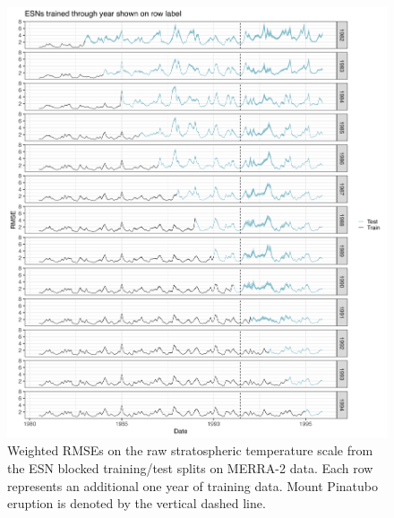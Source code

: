 \documentclass[AMS,STIX2COL]{WileyNJD-v2}
\begin{document}
\begin{figure}[h]
    \centering
    \includegraphics[width=\textwidth]{figures/merra2_rmse.png}
    \caption{Weighted RMSEs on the raw stratospheric temperature scale from the ESN blocked training/test splits on MERRA-2 data. Each row represents an additional one year of training data. Mount Pinatubo eruption is denoted by the vertical dashed line.}
    \label{fig:merra2rmse}
\end{figure}
\end{document}
